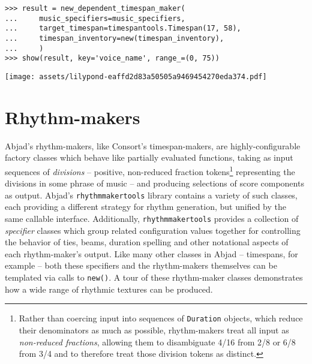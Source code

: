 \begin{comment}
<abjad>
result = new_dependent_timespan_maker(
    music_specifiers=music_specifiers,
    target_timespan=timespantools.Timespan(17, 58),
    timespan_inventory=new(timespan_inventory),
    )
show(result, key='voice_name', range_=(0, 75))
</abjad>
\end{comment}

\begin{abjadbookoutput}
\begin{singlespacing}
\vspace{-0.5\baselineskip}
\begin{verbatim}
>>> result = new_dependent_timespan_maker(
...     music_specifiers=music_specifiers,
...     target_timespan=timespantools.Timespan(17, 58),
...     timespan_inventory=new(timespan_inventory),
...     )
>>> show(result, key='voice_name', range_=(0, 75))
\end{verbatim}
\noindent\texttt{[image: assets/lilypond-eaffd2d83a50505a9469454270eda374.pdf]}
\end{singlespacing}
\end{abjadbookoutput}

\section{Rhythm-makers}
\label{sec:rhythm-makers}

Abjad's rhythm-makers, like Consort's timespan-makers, are highly-configurable
factory classes which behave like partially evaluated functions, taking as
input sequences of \emph{divisions} -- positive, non-reduced fraction
tokens\footnote{Rather than coercing input into sequences of \texttt{Duration}
objects, which reduce their denominators as much as possible, rhythm-makers
treat all input as \emph{non-reduced fractions}, allowing them to disambiguate
4/16 from 2/8 or 6/8 from 3/4 and to therefore treat those division tokens as
distinct.} representing the divisions in some phrase of music -- and producing
selections of score components as output. Abjad's \texttt{rhythmmakertools}
library contains a variety of such classes, each providing a different strategy
for rhythm generation, but unified by the same callable interface.
Additionally, \texttt{rhythmmakertools} provides a collection of
\emph{specifier} classes which group related configuration values together for
controlling the behavior of ties, beams, duration spelling and other notational
aspects of each rhythm-maker's output. Like many other classes in Abjad --
timespans, for example -- both these specifiers and the rhythm-makers
themselves can be templated via calls to \texttt{new()}. A tour of these
rhythm-maker classes demonstrates how a wide range of rhythmic textures can be
produced.

